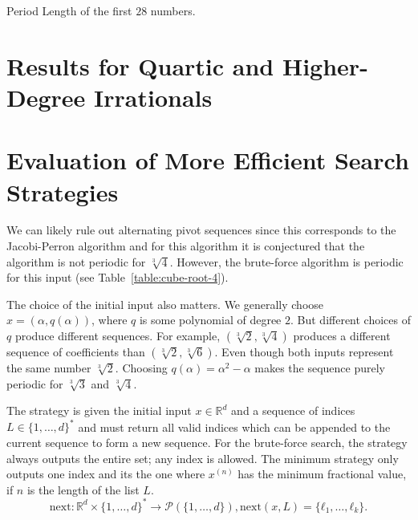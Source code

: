 \begin{table}[t]
  \caption{Period Length of the first $28$ numbers.}
  \centering
  
\end{table}

\section{Results for Quartic and Higher-Degree Irrationals}

\section{Evaluation of More Efficient Search Strategies}

We can likely rule out alternating pivot sequences since this corresponds to
the Jacobi-Perron algorithm and for this algorithm it is conjectured
\cite{Karpenkov21} that the algorithm is not periodic for $\sqrt[3]{4}$.
However, the brute-force algorithm is periodic for this input (see Table~\ref{table:cube-root-4}).

The choice of the initial input also matters.
We generally choose $x = (α, q(α))$, where $q$ is some polynomial of degree $2$.
But different choices of $q$ produce different sequences.
For example, $(\sqrt[3]{2}, \sqrt[3]{4})$ produces a different sequence of coefficients than $(\sqrt[3]{2}, \sqrt[3]{6})$.
Even though both inputs represent the same number $\sqrt[3]{2}$.
Choosing $q(α) = α^2 - α$ makes the sequence purely periodic for $\sqrt[3]{3}$ and $\sqrt[3]{4}$.

The strategy is given the initial input $x ∈ ℝ^d$ and a sequence of indices $L ∈ \{1, …, d\}^*$ and must
return all valid indices which can be appended to the current sequence to form
a new sequence.
For the brute-force search, the strategy always outputs the entire set; any index is allowed.
The minimum strategy only outputs one index and its the one where $x^{(n)}$ has
the minimum fractional value, if $n$ is the length of the list $L$.
\[
  \text{next} \colon ℝ^d × \{1, …, d\}^* → \mathcal P(\{1, …, d\}), \text{next}(x, L) = \{ℓ_1, …, ℓ_k\}.
\]
